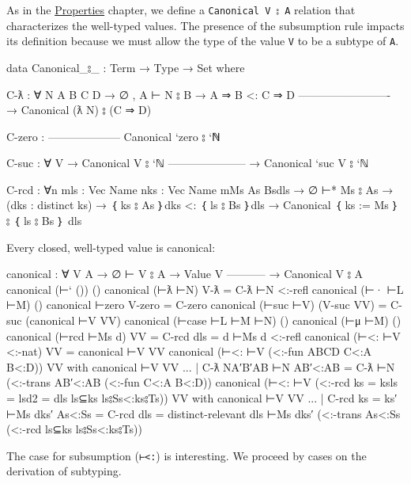 As in the \protect\hyperlink{Properties}{Properties} chapter, we define
a \texttt{Canonical\ V\ ⦂\ A} relation that characterizes the well-typed
values. The presence of the subsumption rule impacts its definition
because we must allow the type of the value \texttt{V} to be a subtype
of \texttt{A}.

\begin{fence}
\begin{code}
data Canonical_⦂_ : Term → Type → Set where

  C-ƛ : ∀ {N A B C D}
    →  ∅ , A ⊢ N ⦂ B
    → A ⇒ B <: C ⇒ D
      -------------------------
    → Canonical (ƛ N) ⦂ (C ⇒ D)

  C-zero :
      --------------------
      Canonical `zero ⦂ `ℕ

  C-suc : ∀ {V}
    → Canonical V ⦂ `ℕ
      ---------------------
    → Canonical `suc V ⦂ `ℕ

  C-rcd : ∀{n m}{ls : Vec Name n}{ks : Vec Name m}{Ms As Bs}{dls}
    → ∅ ⊢* Ms ⦂ As
    → (dks : distinct ks)
    → ｛ ks ⦂ As ｝{dks}  <: ｛ ls ⦂ Bs ｝{dls}
    → Canonical ｛ ks := Ms ｝ ⦂ ｛ ls ⦂ Bs ｝ {dls}
\end{code}
\end{fence}

Every closed, well-typed value is canonical:

\begin{fence}
\begin{code}
canonical : ∀ {V A}
  → ∅ ⊢ V ⦂ A
  → Value V
    -----------
  → Canonical V ⦂ A
canonical (⊢` ())          ()
canonical (⊢ƛ ⊢N)          V-ƛ         =  C-ƛ ⊢N <:-refl
canonical (⊢· ⊢L ⊢M)       ()
canonical ⊢zero            V-zero      =  C-zero
canonical (⊢suc ⊢V)        (V-suc VV)  =  C-suc (canonical ⊢V VV)
canonical (⊢case ⊢L ⊢M ⊢N) ()
canonical (⊢μ ⊢M)          ()
canonical (⊢rcd ⊢Ms d) VV = C-rcd {dls = d} ⊢Ms d <:-refl
canonical (⊢<: ⊢V <:-nat) VV = canonical ⊢V VV
canonical (⊢<: ⊢V (<:-fun {A}{B}{C}{D} C<:A B<:D)) VV
    with canonical ⊢V VV
... | C-ƛ {N}{A′}{B′}{A}{B} ⊢N  AB′<:AB = C-ƛ ⊢N (<:-trans AB′<:AB (<:-fun C<:A B<:D))
canonical (⊢<: ⊢V (<:-rcd {ks = ks}{ls = ls}{d2 = dls} ls⊆ks ls⦂Ss<:ks⦂Ts)) VV
    with canonical ⊢V VV
... | C-rcd {ks = ks′} ⊢Ms dks′ As<:Ss =
      C-rcd {dls = distinct-relevant dls} ⊢Ms dks′ (<:-trans As<:Ss (<:-rcd ls⊆ks ls⦂Ss<:ks⦂Ts))
\end{code}
\end{fence}

The case for subsumption (\texttt{⊢\textless{}:}) is interesting. We
proceed by cases on the derivation of subtyping.

